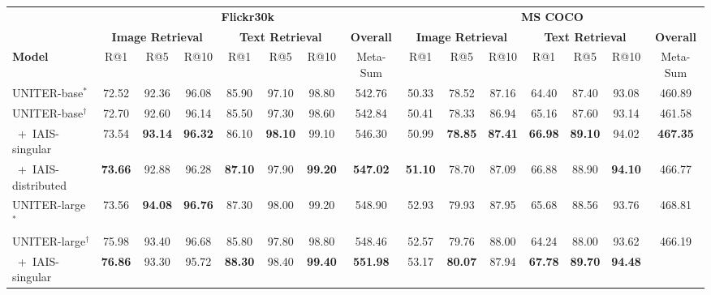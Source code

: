 \documentclass[11pt,a4paper]{article}
\begin{document}
\begin{table*}[t]
\begin{adjustbox}{max width=\textwidth}
\begin{tabular}{@{}lcccccccccccccc@{}}
\toprule
 &
  \multicolumn{7}{c}{\textbf{Flickr30k}} &
  \multicolumn{7}{c}{\textbf{MS COCO}} \\ \cmidrule(lr){2-8} \cmidrule(l){9-15}
 &
  \multicolumn{3}{c}{\textbf{Image Retrieval}} &
  \multicolumn{3}{c}{\textbf{Text Retrieval}} &
  \textbf{Overall} &
  \multicolumn{3}{c}{\textbf{Image Retrieval}} &
  \multicolumn{3}{c}{\textbf{Text Retrieval}} &
  \textbf{Overall} \\ \cmidrule(lr){2-4} \cmidrule(lr){5-7} \cmidrule(lr){8-8} \cmidrule(lr){9-11} \cmidrule(lr){12-14} \cmidrule(l){15-15}     
\textbf{Model} &
  R@1 &
  R@5 &
  R@10 &
  R@1 &
  R@5 &
  R@10 &
  Meta-Sum &
  R@1 &
  R@5 &
  R@10 &
  R@1 &
  R@5 &
  R@10 &
  Meta-Sum \\ \midrule
UNITER-base$^*$ &
  72.52 &
  92.36 &
  96.08 &
  85.90 &
  97.10 &
  98.80 &
  542.76 &
  50.33 &
  78.52 &
  87.16 &
  64.40 &
  87.40 &
  93.08 &
  460.89 \\
UNITER-base$^\dagger$ &
  72.70 &
  92.60 &
  96.14 &
  85.50 &
  97.30 &
  98.60 &
  542.84 &
  50.41 &
  78.33 &
  86.94 &
  65.16 &
  87.60 &
  93.14 &
  461.58 \\ \midrule
~+~IAIS-singular &
  73.54 &
  \textbf{93.14} &
  \textbf{96.32} &
  86.10 &
  \textbf{98.10} &
  99.10 &
  546.30 &
  50.99 &
  \textbf{78.85} &
  \textbf{87.41} &
  \textbf{66.98} &
  \textbf{89.10} &
  94.02 &
  \textbf{467.35} \\
~+~IAIS-distributed &
  \textbf{73.66} &
  92.88 &
  96.28 &
  \textbf{87.10} &
  97.90 &
  \textbf{99.20} &
  \textbf{547.02} &
  \textbf{51.10} &
  78.70 &
  87.09 &
  66.88 &
  88.90 &
  \textbf{94.10} &
  466.77 \\ \midrule
UNITER-large$^*$ &
  73.56 &
  \textbf{94.08} &
  \textbf{96.76} &
  87.30 &
  98.00 &
  99.20 &
  548.90 &
  52.93 &
  79.93 &
  87.95 &
  65.68 &
  88.56 &
  93.76 &
  468.81 \\
UNITER-large$^\dagger$ &
  75.98 &
  93.40 &
  96.68 &
  85.80 &
  97.80 &
  98.80 &
  548.46 &
  52.57 &
  79.76 &
  88.00 &
  64.24 &
  88.00 &
  93.62 &
  466.19 \\ \midrule
~+~IAIS-singular &
  \textbf{76.86} &
  93.30 &
  95.72 &
  \textbf{88.30} &
  98.40 &
  \textbf{99.40} &
  \textbf{551.98} &
  53.17 &
  \textbf{80.07} &
  87.94 &
  \textbf{67.78} &
  \textbf{89.70} &
  \textbf{94.48} &

\end{tabular}
\end{adjustbox}
\end{table*}
\end{document}
